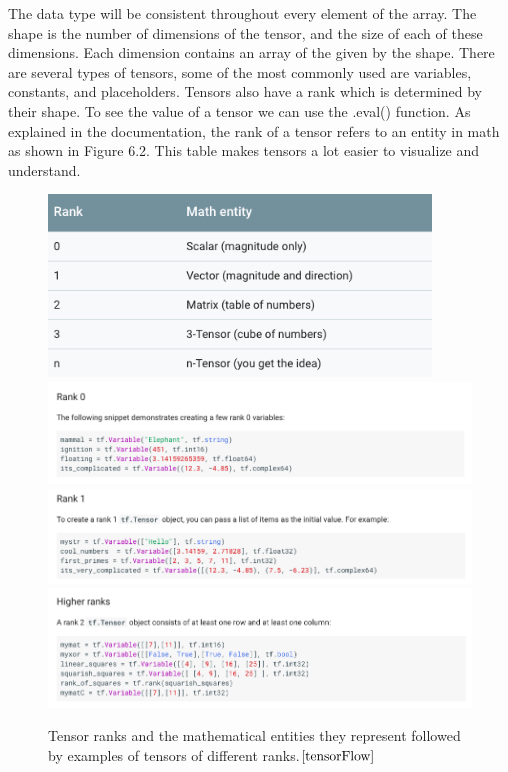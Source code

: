 \documentclass[12pt]{report} %
\begin{document}
	The data type will be consistent throughout every element of the array. The shape is the number of dimensions of the tensor, and the size of each of these dimensions. Each dimension contains an array of the given by the shape. There are several types of tensors, some of the most commonly used are variables, constants, and placeholders. Tensors also have a rank which is determined by their shape. To see the value of a tensor we can use the .eval() function. As explained in the documentation, the rank of a tensor refers to an entity in math as shown in Figure 6.2. This table makes tensors a lot easier to visualize and understand\cite{tensorFlow}.
\begin{figure}
\centering
\includegraphics[width=4in]{tf_rank}
\includegraphics[width=7in]{rank0}
\includegraphics[width=7in]{rank2}
\includegraphics[width=7in]{rank1}
\caption[TensorFlow Ranks]
	{Tensor ranks and the mathematical entities they represent followed by examples of tensors of different ranks.$\cite{tensorFlow}$}
\end{figure}	
\end{document}

